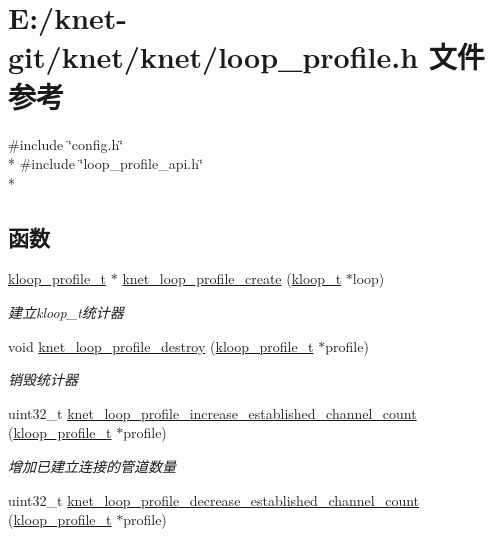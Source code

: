 \hypertarget{a00079}{}\section{E\+:/knet-\/git/knet/knet/loop\+\_\+profile.h 文件参考}
\label{a00079}
{\ttfamily \#include \char`\"{}config.\+h\char`\"{}}\\*
{\ttfamily \#include \char`\"{}loop\+\_\+profile\+\_\+api.\+h\char`\"{}}\\*
\subsection*{函数}
\begin{DoxyCompactItemize}
\item 
\hyperlink{a00051_ab75a5c23099a6118c469ed160b277f28_ab75a5c23099a6118c469ed160b277f28}{kloop\+\_\+profile\+\_\+t} $\ast$ \hyperlink{a00079_a2ceadcfacc62456cf26ac88ebe09fd50_a2ceadcfacc62456cf26ac88ebe09fd50}{knet\+\_\+loop\+\_\+profile\+\_\+create} (\hyperlink{a00051_a97fc76209a58362019f1ded9169e397f_a97fc76209a58362019f1ded9169e397f}{kloop\+\_\+t} $\ast$loop)
\begin{DoxyCompactList}\small\item\em 建立kloop\+\_\+t统计器 \end{DoxyCompactList}\item 
void \hyperlink{a00079_a760cc20cb3dc6a361e6b5f67576f2bbc_a760cc20cb3dc6a361e6b5f67576f2bbc}{knet\+\_\+loop\+\_\+profile\+\_\+destroy} (\hyperlink{a00051_ab75a5c23099a6118c469ed160b277f28_ab75a5c23099a6118c469ed160b277f28}{kloop\+\_\+profile\+\_\+t} $\ast$profile)
\begin{DoxyCompactList}\small\item\em 销毁统计器 \end{DoxyCompactList}\item 
uint32\+\_\+t \hyperlink{a00079_ab75ba9cdc68d1b4ec059974df4b67165_ab75ba9cdc68d1b4ec059974df4b67165}{knet\+\_\+loop\+\_\+profile\+\_\+increase\+\_\+established\+\_\+channel\+\_\+count} (\hyperlink{a00051_ab75a5c23099a6118c469ed160b277f28_ab75a5c23099a6118c469ed160b277f28}{kloop\+\_\+profile\+\_\+t} $\ast$profile)
\begin{DoxyCompactList}\small\item\em 增加已建立连接的管道数量 \end{DoxyCompactList}\item 
uint32\+\_\+t \hyperlink{a00079_ae34c1df8f99b26184f7380c90cc1e799_ae34c1df8f99b26184f7380c90cc1e799}{knet\+\_\+loop\+\_\+profile\+\_\+decrease\+\_\+established\+\_\+channel\+\_\+count} (\hyperlink{a00051_ab75a5c23099a6118c469ed160b277f28_ab75a5c23099a6118c469ed160b277f28}{kloop\+\_\+profile\+\_\+t} $\ast$profile)

\end{DoxyCompactItemize}
